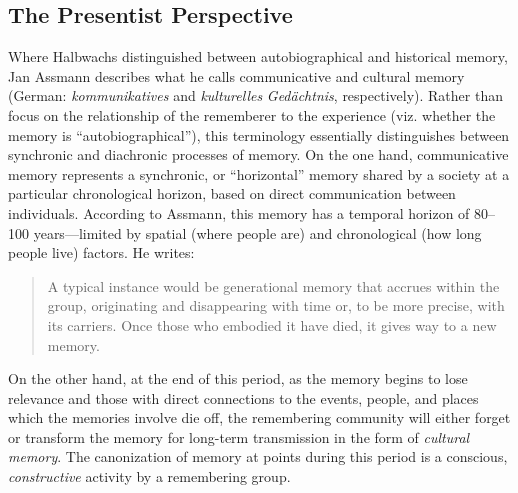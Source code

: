 \hypertarget{the-presentist-perspective}{%
\subsection{The Presentist
Perspective}\label{the-presentist-perspective}}

Where Halbwachs distinguished between autobiographical and historical
memory, Jan Assmann describes what he calls communicative and cultural
memory (German: \emph{kommunikatives} and \emph{kulturelles}
\emph{Gedächtnis}, respectively).\autocites[36]{assmann2011}[For a
concise terminological crash-course,
see][182--183]{hubenthal_carstens-hasselbalch2012} Rather than focus on
the relationship of the rememberer to the experience (viz. whether the
memory is ``autobiographical''), this terminology essentially
distinguishes between synchronic and diachronic processes of memory. On
the one hand, communicative memory represents a synchronic, or
``horizontal'' memory shared by a society at a particular chronological
horizon, based on direct communication between individuals. According to
Assmann, this memory has a temporal horizon of 80--100 years---limited
by spatial (where people are) and chronological (how long people live)
factors. He writes:

\begin{quote}
A typical instance would be generational memory that accrues within the
group, originating and disappearing with time or, to be more precise,
with its carriers. Once those who embodied it have died, it gives way to
a new memory.\autocite[36]{assmann2011}
\end{quote}

On the other hand, at the end of this period, as the memory begins to
lose relevance and those with direct connections to the events, people,
and places which the memories involve die off, the remembering community
will either forget or transform the memory for long-term transmission in
the form of \emph{cultural memory}. The canonization of memory at points
during this period is a conscious, \emph{constructive} activity by a
remembering group. \autocite[45]{assmann2011}

